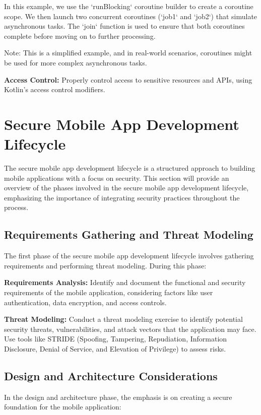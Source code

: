 \documentclass[conference]{IEEEtran}
\begin{document}
In this example, we use the `runBlocking` coroutine builder to create a coroutine scope. We then launch two concurrent coroutines (`job1` and `job2`) that simulate asynchronous tasks. The `join` function is used to ensure that both coroutines complete before moving on to further processing.

Note: This is a simplified example, and in real-world scenarios, coroutines might be used for more complex asynchronous tasks.


\textbf{Access Control:} Properly control access to sensitive resources and APIs, using Kotlin's access control modifiers.

\section{Secure Mobile App Development Lifecycle}

The secure mobile app development lifecycle is a structured approach to building mobile applications with a focus on security. This section will provide an overview of the phases involved in the secure mobile app development lifecycle, emphasizing the importance of integrating security practices throughout the process.

\subsection{Requirements Gathering and Threat Modeling}

The first phase of the secure mobile app development lifecycle involves gathering requirements and performing threat modeling. During this phase:

\textbf{Requirements Analysis:} Identify and document the functional and security requirements of the mobile application, considering factors like user authentication, data encryption, and access controls.

\textbf{Threat Modeling:} Conduct a threat modeling exercise to identify potential security threats, vulnerabilities, and attack vectors that the application may face. Use tools like STRIDE (Spoofing, Tampering, Repudiation, Information Disclosure, Denial of Service, and Elevation of Privilege) to assess risks.

\subsection{Design and Architecture Considerations}

In the design and architecture phase, the emphasis is on creating a secure foundation for the mobile application:
\end{document}
